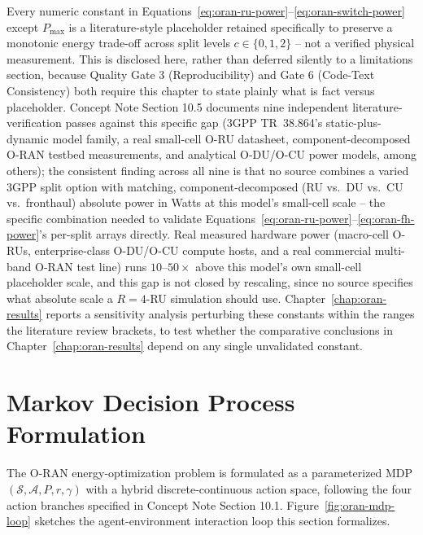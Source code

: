 Every numeric constant in Equations~\ref{eq:oran-ru-power}--\ref{eq:oran-switch-power}
except $P_{\max}$ is a literature-style placeholder retained specifically
to preserve a monotonic energy trade-off across split levels $c \in
\{0,1,2\}$ -- not a verified physical measurement. This is disclosed here,
rather than deferred silently to a limitations section, because Quality
Gate 3 (Reproducibility) and Gate 6 (Code-Text Consistency) both require
this chapter to state plainly what is fact versus placeholder. Concept
Note Section 10.5 documents nine independent literature-verification
passes against this specific gap (3GPP TR~38.864's static-plus-dynamic
model family, a real small-cell O-RU datasheet, component-decomposed O-RAN
testbed measurements, and analytical O-DU/O-CU power models, among
others); the consistent finding across all nine is that no source
combines a varied 3GPP split option with matching, component-decomposed
(RU vs.\ DU vs.\ CU vs.\ fronthaul) absolute power in Watts at this
model's small-cell scale -- the specific combination needed to validate
Equations~\ref{eq:oran-ru-power}--\ref{eq:oran-fh-power}'s per-split
arrays directly. Real measured hardware power (macro-cell O-RUs,
enterprise-class O-DU/O-CU compute hosts, and a real commercial multi-band
O-RAN test line) runs $10$--$50\times$ above this model's own small-cell
placeholder scale, and this gap is not closed by rescaling, since no
source specifies what absolute scale a $R=4$-RU simulation should use.
Chapter~\ref{chap:oran-results} reports a sensitivity analysis
perturbing these constants within the ranges the literature review
brackets, to test whether the comparative conclusions in
Chapter~\ref{chap:oran-results} depend on any single unvalidated constant.

\section{Markov Decision Process Formulation}
\label{sec:oran-mdp}

The O-RAN energy-optimization problem is formulated as a parameterized MDP
$(\mathcal{S}, \mathcal{A}, P, r, \gamma)$ with a hybrid discrete-continuous
action space, following the four action branches specified in Concept Note
Section 10.1. Figure~\ref{fig:oran-mdp-loop} sketches the agent-environment
interaction loop this section formalizes.

